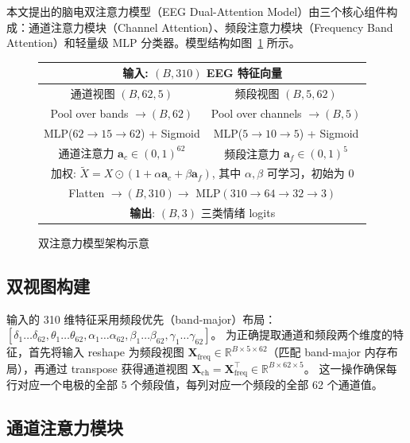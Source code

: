\documentclass[12pt,a4paper]{ctexart}
\begin{document}
本文提出的脑电双注意力模型（EEG Dual-Attention Model）由三个核心组件构成：通道注意力模块（Channel Attention）、频段注意力模块（Frequency Band Attention）和轻量级 MLP 分类器。模型结构如图~\ref{fig:arch} 所示。

\begin{figure}[H]
\centering
\footnotesize
\begin{tabular}{|c|c|c|c|}
\hline
\multicolumn{4}{|c|}{\textbf{输入}: $(B, 310)$ EEG 特征向量} \\
\hline
\multicolumn{2}{|c|}{通道视图 $(B, 62, 5)$} & \multicolumn{2}{c|}{频段视图 $(B, 5, 62)$} \\
\multicolumn{2}{|c|}{Pool over bands $\to (B, 62)$} & \multicolumn{2}{c|}{Pool over channels $\to (B, 5)$} \\
\multicolumn{2}{|c|}{MLP($62\to15\to62$) + Sigmoid} & \multicolumn{2}{c|}{MLP($5\to10\to5$) + Sigmoid} \\
\multicolumn{2}{|c|}{通道注意力 $\mathbf{a}_c \in (0,1)^{62}$} & \multicolumn{2}{c|}{频段注意力 $\mathbf{a}_f \in (0,1)^{5}$} \\
\hline
\multicolumn{4}{|c|}{加权: $\tilde{X} = X \odot (1 + \alpha\mathbf{a}_c + \beta\mathbf{a}_f)$, 其中 $\alpha,\beta$ 可学习，初始为 0} \\
\hline
\multicolumn{4}{|c|}{Flatten $\to (B, 310) \to$ MLP$(310\to64\to32\to3)$} \\
\hline
\multicolumn{4}{|c|}{\textbf{输出}: $(B, 3)$ 三类情绪 logits} \\
\hline
\end{tabular}
\caption{双注意力模型架构示意}
\label{fig:arch}
\end{figure}

\subsection{双视图构建}

输入的 310 维特征采用频段优先（band-major）布局：$[\delta_1\dots\delta_{62}, \theta_1\dots\theta_{62}, \alpha_1\dots\alpha_{62}, \beta_1\dots\beta_{62}, \gamma_1\dots\gamma_{62}]$。
为正确提取通道和频段两个维度的特征，首先将输入 reshape 为频段视图 $\mathbf{X}_{\text{freq}} \in \mathbb{R}^{B \times 5 \times 62}$（匹配 band-major 内存布局），再通过 transpose 获得通道视图 $\mathbf{X}_{\text{ch}} = \mathbf{X}_{\text{freq}}^\top \in \mathbb{R}^{B \times 62 \times 5}$。
这一操作确保每行对应一个电极的全部 5 个频段值，每列对应一个频段的全部 62 个通道值。

\subsection{通道注意力模块}
\end{document}
